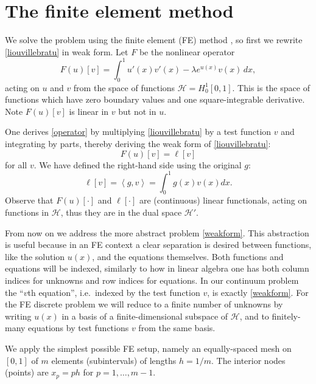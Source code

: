 \documentclass[letterpaper,final,12pt,reqno]{amsart}
\newcommand{\ip}[2]{\left<#1,#2\right>}
\begin{document}
\section{The finite element method}

We solve the problem using the finite element (FE) method \cite{Bueler2021,Elmanetal2014}, so first we rewrite \eqref{liouvillebratu} in weak form.  Let $F$ be the nonlinear operator
\begin{equation}
  F(u)[v] = \int_0^1 u'(x) v'(x) - \lambda e^{u(x)} v(x)\, dx,  \label{operator}
\end{equation}
acting on $u$ and $v$ from the space of functions $\mathcal{H}=H_0^1[0,1]$.  This is the space of functions which have zero boundary values and one square-integrable derivative.  Note $F(u)[v]$ is linear in $v$ but not in $u$.

One derives \eqref{operator} by multiplying \eqref{liouvillebratu} by a test function $v$ and integrating by parts, thereby deriving the weak form of \eqref{liouvillebratu}:
\begin{equation}
  F(u)[v] = \ell[v] \label{weakform}
\end{equation}
for all $v$.  We have defined the right-hand side using the original $g$:
\begin{equation}
  \ell[v] = \ip{g}{v} = \int_0^1 g(x) v(x) dx.  \label{rhsfunctional}
\end{equation}
Observe that $F(u)[\cdot]$ and $\ell[\cdot]$ are (continuous) linear functionals, acting on functions in $\mathcal{H}$, thus they are in the dual space $\mathcal{H}'$.

From now on we address the more abstract problem \eqref{weakform}.  This abstraction is useful because in an FE context a clear separation is desired between functions, like the solution $u(x)$, and the equations themselves.  Both functions and equations will be indexed, similarly to how in linear algebra one has both column indices for unknowns and row indices for equations.  In our continuum problem the ``$v$th equation'', i.e.~indexed by the test function $v$, is exactly \eqref{weakform}.  For the FE discrete problem we will reduce to a finite number of unknowns by writing $u(x)$ in a basis of a finite-dimensional subspace of $\mathcal{H}$, and to finitely-many equations by test functions $v$ from the same basis.

We apply the simplest possible FE setup, namely an equally-spaced mesh on $[0,1]$ of $m$ elements (subintervals) of lengths $h=1/m$.  The interior nodes (points) are $x_p=ph$ for $p=1,\dots,m-1$.
\end{document}
